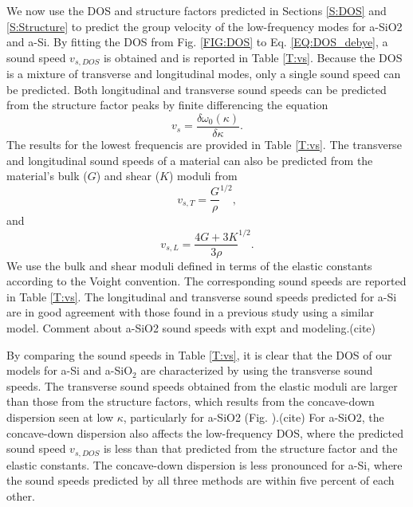 \documentclass[aps,prb,onecolumn,preprint,superscriptaddress,footinbib,amsmath,amssymb,floatfix]{revtex4}
\begin{document}
We now use the DOS and structure factors predicted in 
Sections \ref{S:DOS} and \ref{S:Structure} to 
predict the group velocity of the low-frequency modes for 
a-SiO2 and a-Si. By fitting the DOS 
from Fig. \ref{FIG:DOS} to Eq. \eqref{EQ:DOS_debye}, 
a sound speed $v_{s,DOS}$ is obtained and is  
reported in Table \ref{T:vs}. Because the DOS is a mixture of 
transverse and longitudinal modes, only a single sound speed can be 
predicted. 
Both longitudinal and transverse sound speeds can be predicted from 
the structure factor peaks by finite 
differencing the equation 
\begin{equation}\label{EQ:vs_dwdk}
v_{s} = \frac{ \delta \omega_0(\kappa)}{\delta \kappa}.
\end{equation}
The results for the lowest frequencis are provided in Table \ref{T:vs}. 
The transverse and longitudinal sound speeds of a material can 
also be predicted from the material's bulk ($G$) and 
shear ($K$) moduli from 
\begin{equation}\label{EQ:vs_T_elas}
v_{s,T} = \frac{G}{\rho}^{1/2},
\end{equation}
and 
\begin{equation}\label{EQ:vs_L_elas}
v_{s,L} = \frac{4G + 3K}{3\rho}^{1/2}.
\end{equation}
We use the bulk and shear moduli defined in terms of the elastic 
constants according to the Voight convention.\cite{gale_general_2003}  
The corresponding sound speeds are reported in Table \ref{T:vs}. 
The longitudinal and transverse sound speeds predicted for a-Si are 
in good agreement with those found in a previous study using a similar 
model.\cite{feldman_thermal_1993,feldman_numerical_1999} 
Comment about a-SiO2 sound speeds with expt and modeling.(cite)

By comparing the sound speeds in Table \ref{T:vs}, it is clear that 
the DOS of our models for a-Si and a-SiO$_2$ are characterized by using the 
transverse sound speeds.  
The transverse sound speeds obtained from the 
elastic moduli are larger than those from the structure factors, 
which results from the concave-down dispersion seen at low 
$\kappa$, particularly for a-SiO2 (Fig. ).(cite) 
For a-SiO2, the concave-down dispersion
also affects the low-frequency DOS, where the predicted sound speed 
$v_{s,DOS}$ is less than that predicted from the structure factor 
and the elastic constants. The concave-down dispersion 
is less pronounced for a-Si, where the sound speeds predicted 
by all three methods are within five percent of each other. 
\end{document}
